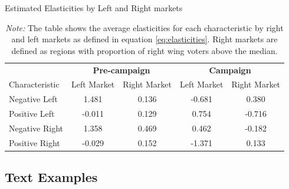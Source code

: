 \documentclass[12pt]{article}
\begin{document}
	
	
	
	
	
	\begin{table}[!htb]
		
		\caption{Estimated Elasticities by Left and Right markets}
		\begin{tabular}{l|cc|cc}
			\toprule
			& \multicolumn{2}{c|}{\textbf{Pre-campaign}} & \multicolumn{2}{c}{\textbf{Campaign}} \\
			Characteristic & Left Market & Right Market & Left Market & Right Market \\
			\midrule
			Negative Left & 1.481 & 0.136 & -0.681 & 0.380 \\
			Positive Left & -0.011 & 0.129 & 0.754 & -0.716 \\
			Negative Right & 1.358 & 0.469 & 0.462 & -0.182 \\
			Positive Right & -0.029 & 0.152 & -1.371 & 0.133 \\
			\bottomrule
		\end{tabular}
		\caption*{\textit{Note:} \small The table shows the average elasticities for each characteristic by right and left markets as defined in equation \ref{eq:elasticities}. Right markets are defined as regions with proportion of right wing voters above the median. }
		\label{tab:elasticities}
	\end{table}
	
	
	
\clearpage
	\subsection{Text Examples}
	
\end{document}
